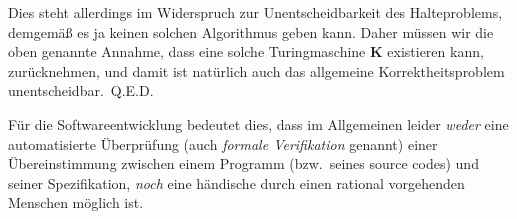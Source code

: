 Dies steht allerdings im Widerspruch zur Unentscheidbarkeit des Halteproblems, demge\-m\"{a}{\ss} es ja keinen solchen Algorithmus geben kann. Daher m\"{u}ssen wir die oben genannte Annahme, dass eine solche Turingmaschine $\mathbf{K}$ existieren kann, zur\"{u}cknehmen, und damit ist nat\"{u}rlich auch das allgemeine Korrektheitsproblem unentscheidbar.~Q.E.D.\newline

\noindent F\"{u}r die Softwareentwicklung bedeutet dies, dass im Allgemeinen leider \emph{weder} eine automatisierte \"{U}berpr\"{u}fung (auch \emph{formale Verifikation} genannt) einer \"{U}bereinstimmung zwischen einem Programm (bzw.\ seines source codes) und seiner Spezifikation, \emph{noch} eine h\"{a}ndische durch einen rational vorgehenden Menschen m\"{o}glich ist.
